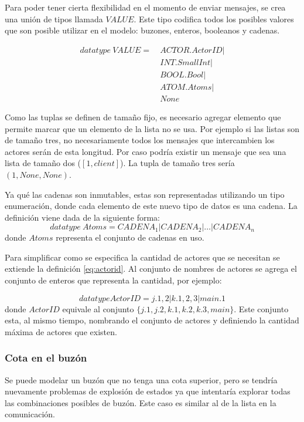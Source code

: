Para poder tener cierta flexibilidad en el momento de enviar mensajes, se crea una unión de tipos llamada $VALUE$. Este tipo codifica todos los posibles valores que son posible utilizar en el modelo: buzones, enteros, booleanos y cadenas. 

\begin{align*}
datatype\ VALUE =\ & ACTOR.ActorID | \\
& INT.SmallInt | \\
& BOOL.Bool |  \\
& ATOM.Atoms | \\
& None
\end{align*}


Como las tuplas se definen de tamaño fijo, es necesario agregar elemento que permite marcar que un elemento de la lista no se usa. Por ejemplo si las listas son de tamaño tres, no necesariamente todos los mensajes que intercambien los actores serán de esta longitud. Por caso podría existir un mensaje que sea una lista de tamaño dos ($[1, client]$). La tupla de tamaño tres sería $(1, None, None)$. 

Ya qué las cadenas son inmutables, estas son representadas utilizando un tipo enumeración, donde cada elemento de este nuevo tipo de datos es una cadena. La definición viene dada de la siguiente forma:
\begin{equation*}
  datatype\ Atoms = CADENA_1 | CADENA_2 | \ldots | CADENA_n	
\end{equation*}
donde $Atoms$ representa el conjunto de cadenas en uso.

Para simplificar como se especifica la cantidad de actores que se necesitan se extiende la definición \eqref{eq:actorid}. Al conjunto de nombres de actores se agrega el conjunto de enteros que representa la cantidad, por ejemplo:

\[
  datatype ActorID = j.{1,2} | k.{1,2,3} | main.{1}
\]
donde $ActorID$ equivale al conjunto $\{j.1, j.2, k.1, k.2, k.3, main\}$. Este conjunto esta, al mismo tiempo, nombrando el conjunto de actores y definiendo la cantidad máxima de actores que existen.

\subsubsection*{Cota en el buzón}

Se puede modelar un buzón que no tenga una cota superior, pero se tendría nuevamente problemas de explosión de estados ya que \FDR intentaría explorar todas las combinaciones posibles de buzón. Este caso es similar al de la lista en la comunicación. 

